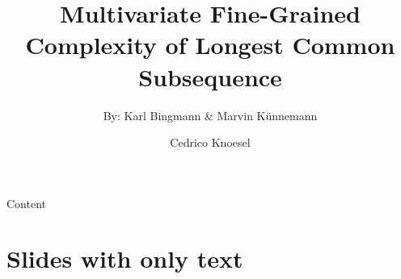 \documentclass[
 UKenglish%
 ]{beamer}%
\author[C.\, Knoesel]{Cedrico Knoesel}
\title[Multivariate Fine-Grained Complexity of LCS]{Multivariate Fine-Grained Complexity of Longest Common Subsequence}
\subtitle{By: Karl Bingmann \& Marvin Künnemann}
\institute[]{}
\begin{document}



\frame[KITgreenhalf]{\titlepage}



\begin{frame}[KITgreenTOC,t]{\fontsize{10}{10}\selectfont\textcolor{KITwhite}{Content}\hfill{}\hbox{\scalebox{0.72}{\KITlogo}}\kern3mm}
  \vspace*{-5mm}%
  \tableofcontents
\end{frame}







\section{Slides with only text}
\end{document}
